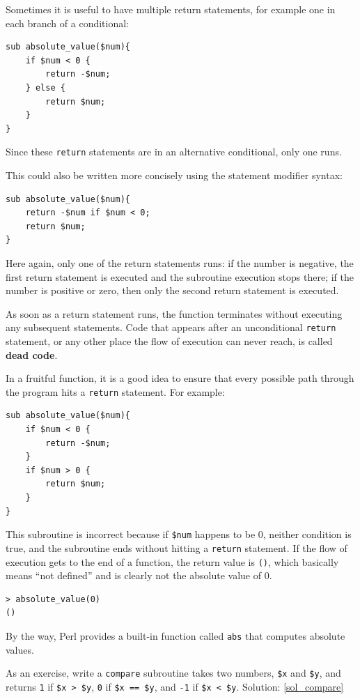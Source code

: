 Sometimes it is useful to have multiple return statements, for 
example one in each branch of a conditional:

\begin{verbatim}
sub absolute_value($num){
    if $num < 0 {
        return -$num;
    } else {
        return $num;
    }
}
\end{verbatim}
%
Since these {\tt return} statements are in an alternative 
conditional, only one runs.

This could also be written more concisely using the statement 
modifier syntax:

\begin{verbatim}
sub absolute_value($num){
    return -$num if $num < 0;
    return $num;
}
\end{verbatim}
%
Here again, only one of the return statements runs: if the 
number is negative, the first return statement is executed and 
the subroutine execution stops there; if the number is 
positive or zero, then only the second return statement is 
executed. 

As soon as a return statement runs, the function
terminates without executing any subsequent statements.
Code that appears after an unconditional {\tt return} statement, 
or any other place the flow of execution can never reach, 
is called {\bf dead code}.

In a fruitful function, it is a good idea to ensure
that every possible path through the program hits a
{\tt return} statement.  For example:

\begin{verbatim}
sub absolute_value($num){
    if $num < 0 {
        return -$num;
    } 
    if $num > 0 {
        return $num;
    }
}
\end{verbatim}
%


This subroutine is incorrect because if {\tt \$num} happens to be 0,
neither condition is true, and the subroutine ends without hitting a
{\tt return} statement.  If the flow of execution gets to the end
of a function, the return value is {\tt ()}, which basically 
means ``not defined'' and is clearly not the absolute value of 0.

\begin{verbatim}
> absolute_value(0)
()
\end{verbatim}
%
By the way, Perl provides a built-in function called 
{\tt abs} that computes absolute values.

\label{compare}
As an exercise, write a {\tt compare} subroutine 
takes two numbers, {\tt \$x} and {\tt \$y}, and returns {\tt 1} 
if {\tt \$x > \$y}, {\tt 0} if {\tt \$x == \$y}, and 
{\tt -1} if {\tt \$x < \$y}.
Solution: \ref{sol_compare}


